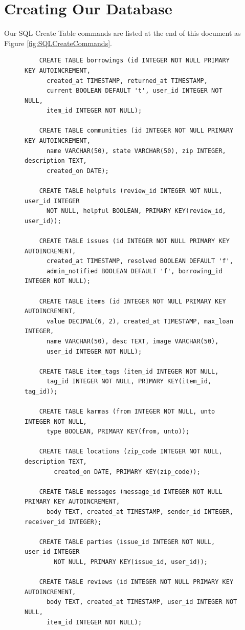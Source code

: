 \documentclass{acm_proc_article-sp}
\begin{document}
\section{Creating Our Database}
Our SQL Create Table commands are listed at the end of this document as Figure \ref{fig:SQLCreateCommands}.
\begin{figure}[p]
    \begin{lstlisting}
    CREATE TABLE borrowings (id INTEGER NOT NULL PRIMARY KEY AUTOINCREMENT, 
      created_at TIMESTAMP, returned_at TIMESTAMP, 
      current BOOLEAN DEFAULT 't', user_id INTEGER NOT NULL, 
      item_id INTEGER NOT NULL);

    CREATE TABLE communities (id INTEGER NOT NULL PRIMARY KEY AUTOINCREMENT,
      name VARCHAR(50), state VARCHAR(50), zip INTEGER, description TEXT, 
      created_on DATE);

    CREATE TABLE helpfuls (review_id INTEGER NOT NULL, user_id INTEGER 
      NOT NULL, helpful BOOLEAN, PRIMARY KEY(review_id, user_id));

    CREATE TABLE issues (id INTEGER NOT NULL PRIMARY KEY AUTOINCREMENT, 
      created_at TIMESTAMP, resolved BOOLEAN DEFAULT 'f', 
      admin_notified BOOLEAN DEFAULT 'f', borrowing_id INTEGER NOT NULL);

    CREATE TABLE items (id INTEGER NOT NULL PRIMARY KEY AUTOINCREMENT, 
      value DECIMAL(6, 2), created_at TIMESTAMP, max_loan INTEGER, 
      name VARCHAR(50), desc TEXT, image VARCHAR(50), 
      user_id INTEGER NOT NULL);

    CREATE TABLE item_tags (item_id INTEGER NOT NULL, 
      tag_id INTEGER NOT NULL, PRIMARY KEY(item_id, tag_id));

    CREATE TABLE karmas (from INTEGER NOT NULL, unto INTEGER NOT NULL, 
      type BOOLEAN, PRIMARY KEY(from, unto));

    CREATE TABLE locations (zip_code INTEGER NOT NULL, description TEXT, 
        created_on DATE, PRIMARY KEY(zip_code));

    CREATE TABLE messages (message_id INTEGER NOT NULL PRIMARY KEY AUTOINCREMENT, 
      body TEXT, created_at TIMESTAMP, sender_id INTEGER, receiver_id INTEGER);

    CREATE TABLE parties (issue_id INTEGER NOT NULL, user_id INTEGER 
        NOT NULL, PRIMARY KEY(issue_id, user_id));

    CREATE TABLE reviews (id INTEGER NOT NULL PRIMARY KEY AUTOINCREMENT, 
      body TEXT, created_at TIMESTAMP, user_id INTEGER NOT NULL, 
      item_id INTEGER NOT NULL);


\end{lstlisting}
\end{figure}
\end{document}
